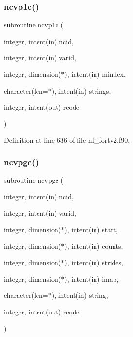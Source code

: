 \mbox{\label{nf__fortv2_8f90_ae86fd9a6227f59f53db68f523802428c}} 
\subsubsection{\texorpdfstring{ncvp1c()}{ncvp1c()}}
{\footnotesize\ttfamily subroutine ncvp1c (\begin{DoxyParamCaption}\item[{integer, intent(in)}]{ncid,  }\item[{integer, intent(in)}]{varid,  }\item[{integer, dimension($\ast$), intent(in)}]{mindex,  }\item[{character(len=$\ast$), intent(in)}]{strings,  }\item[{integer, intent(out)}]{rcode }\end{DoxyParamCaption})}



Definition at line 636 of file nf\+\_\+fortv2.\+f90.

\mbox{\label{nf__fortv2_8f90_ae593f10084ce6b3ed716b1dcf87d6618}} 
\subsubsection{\texorpdfstring{ncvpgc()}{ncvpgc()}}
{\footnotesize\ttfamily subroutine ncvpgc (\begin{DoxyParamCaption}\item[{integer, intent(in)}]{ncid,  }\item[{integer, intent(in)}]{varid,  }\item[{integer, dimension($\ast$), intent(in)}]{start,  }\item[{integer, dimension($\ast$), intent(in)}]{counts,  }\item[{integer, dimension($\ast$), intent(in)}]{strides,  }\item[{integer, dimension($\ast$), intent(in)}]{imap,  }\item[{character(len=$\ast$), intent(in)}]{string,  }\item[{integer, intent(out)}]{rcode }\end{DoxyParamCaption})}



